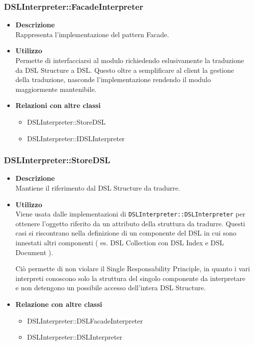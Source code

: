 \subsubsection{DSLInterpreter::FacadeInterpreter}
\begin{itemize}
\item \textbf{Descrizione} \hfill \\
  Rappresenta l'implementazione del pattern Facade.
\item \textbf{Utilizzo} \hfill \\
  Permette di interfacciarsi al modulo richiedendo eslusivamente la traduzione da DSL Structure a DSL. Questo oltre a semplificare al client la gestione della traduzione, nasconde l'implementazione rendendo il modulo maggiormente mantenibile.
\item \textbf{Relazioni con altre classi} \hfill
  \begin{itemize}
  \item DSLInterpreter::StoreDSL
  \item DSLInterpreter::IDSLInterpreter
  \end{itemize}
\end{itemize}
\subsubsection{DSLInterpreter::StoreDSL}
\begin{itemize}
\item \textbf{Descrizione} \hfill \\
  Mantiene il riferimento dal DSL Structure da tradurre.
\item \textbf{Utilizzo} \hfill \\
  Viene usata dalle implementazioni di \texttt{DSLInterpreter::DSLInterpreter} per ottenere l'oggetto riferito da un attributo della struttura da tradurre. Questi casi si riscontrano nella definizione di un componente del DSL in cui sono innestati altri componenti ( es. DSL Collection con DSL Index e DSL Document ).

  Ciò permette di non violare il Single Responsability Principle, in quanto i vari interpreti conoscono solo la struttura del singolo componente da interpretare e non detengono un possibile accesso dell'intera DSL Structure.
\item \textbf{Relazione con altre classi} \hfill
  \begin{itemize}
  \item DSLInterpreter::DSLFacadeInterpreter
  \item DSLInterpreter::DSLInterpreter
  \end{itemize}
\end{itemize}
